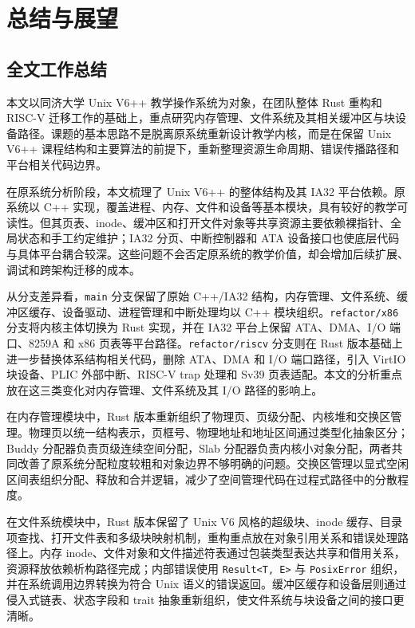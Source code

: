 \chapter{总结与展望}

\section{全文工作总结}

本文以同济大学 Unix V6++ 教学操作系统为对象，在团队整体 Rust 重构和 RISC-V 迁移工作的基础上，重点研究内存管理、文件系统及其相关缓冲区与块设备路径。课题的基本思路不是脱离原系统重新设计教学内核，而是在保留 Unix V6++ 课程结构和主要算法的前提下，重新整理资源生命周期、错误传播路径和平台相关代码边界。

在原系统分析阶段，本文梳理了 Unix V6++ 的整体结构及其 IA32 平台依赖。原系统以 C++ 实现，覆盖进程、内存、文件和设备等基本模块，具有较好的教学可读性。但其页表、inode、缓冲区和打开文件对象等共享资源主要依赖裸指针、全局状态和手工约定维护；IA32 分页、中断控制器和 ATA 设备接口也使底层代码与具体平台耦合较深。这些问题不会否定原系统的教学价值，却会增加后续扩展、调试和跨架构迁移的成本。

从分支差异看，\texttt{main} 分支保留了原始 C++/IA32 结构，内存管理、文件系统、缓冲区缓存、设备驱动、进程管理和中断处理均以 C++ 模块组织。\texttt{refactor/x86} 分支将内核主体切换为 Rust 实现，并在 IA32 平台上保留 ATA、DMA、I/O 端口、8259A 和 x86 页表等平台路径。\texttt{refactor/riscv} 分支则在 Rust 版本基础上进一步替换体系结构相关代码，删除 ATA、DMA 和 I/O 端口路径，引入 VirtIO 块设备、PLIC 外部中断、RISC-V trap 处理和 Sv39 页表适配。本文的分析重点放在这三类变化对内存管理、文件系统及其 I/O 路径的影响上。

在内存管理模块中，Rust 版本重新组织了物理页、页级分配、内核堆和交换区管理。物理页以统一结构表示，页框号、物理地址和地址区间通过类型化抽象区分；Buddy 分配器负责页级连续空间分配，Slab 分配器负责内核小对象分配，两者共同改善了原系统分配粒度较粗和对象边界不够明确的问题。交换区管理以显式空闲区间表组织分配、释放和合并逻辑，减少了空间管理代码在过程式路径中的分散程度。

在文件系统模块中，Rust 版本保留了 Unix V6 风格的超级块、inode 缓存、目录项查找、打开文件表和多级块映射机制，重构重点放在对象引用关系和错误处理路径上。内存 inode、文件对象和文件描述符表通过包装类型表达共享和借用关系，资源释放依赖析构路径完成；内部错误使用 \texttt{Result<T, E>} 与 \texttt{PosixError} 组织，并在系统调用边界转换为符合 Unix 语义的错误返回。缓冲区缓存和设备层则通过侵入式链表、状态字段和 trait 抽象重新组织，使文件系统与块设备之间的接口更清晰。

